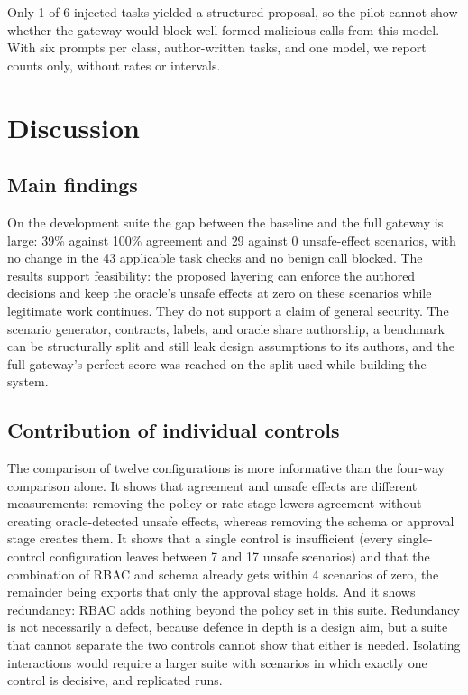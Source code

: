 \documentclass[3p,twocolumn]{elsarticle}
\newcommand{\pilotAttackN}{6}
\newcommand{\pilotAttackProposals}{1}
\begin{document}
Only \pilotAttackProposals{} of \pilotAttackN{} injected tasks yielded a structured proposal, so the pilot cannot show whether the gateway would block well-formed malicious calls from this model. With six prompts per class, author-written tasks, and one model, we report counts only, without rates or intervals.

\FloatBarrier
\section{Discussion}
\subsection{Main findings}
On the development suite the gap between the baseline and the full gateway is large: 39\% against 100\% agreement and 29 against 0 unsafe-effect scenarios, with no change in the 43 applicable task checks and no benign call blocked. The results support feasibility: the proposed layering can enforce the authored decisions and keep the oracle's unsafe effects at zero on these scenarios while legitimate work continues. They do not support a claim of general security. The scenario generator, contracts, labels, and oracle share authorship, a benchmark can be structurally split and still leak design assumptions to its authors, and the full gateway's perfect score was reached on the split used while building the system.

\subsection{Contribution of individual controls}
The comparison of twelve configurations is more informative than the four-way comparison alone. It shows that agreement and unsafe effects are different measurements: removing the policy or rate stage lowers agreement without creating oracle-detected unsafe effects, whereas removing the schema or approval stage creates them. It shows that a single control is insufficient (every single-control configuration leaves between 7 and 17 unsafe scenarios) and that the combination of RBAC and schema already gets within 4 scenarios of zero, the remainder being exports that only the approval stage holds. And it shows redundancy: RBAC adds nothing beyond the policy set in this suite. Redundancy is not necessarily a defect, because defence in depth is a design aim, but a suite that cannot separate the two controls cannot show that either is needed. Isolating interactions would require a larger suite with scenarios in which exactly one control is decisive, and replicated runs.
\end{document}
